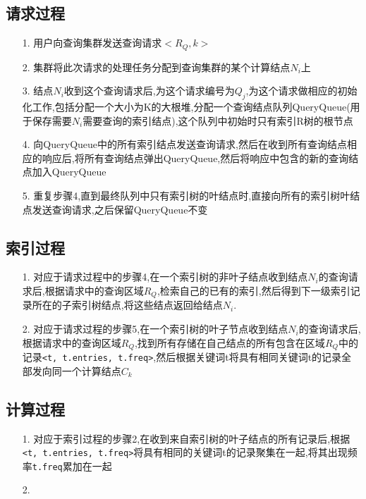 \documentclass{elegantpaper}
\begin{document}
\subsection{请求过程}
\begin{itemize}
    \item[1.] 用户向查询集群发送查询请求$<R_Q,k>$
    \item[2.] 集群将此次请求的处理任务分配到查询集群的某个计算结点$N_i$上
    \item[3.] 结点$N_i$收到这个查询请求后,为这个请求编号为$Q_j$,为这个请求做相应的初始化工作,包括分配一个大小为K的大根堆,分配一个查询结点队列QueryQueue(用于保存需要$N_i$需要查询的索引结点),这个队列中初始时只有索引R树的根节点
    \item[4.] 向QueryQueue中的所有索引结点发送查询请求,然后在收到所有查询结点相应的响应后,将所有查询结点弹出QueryQueue,然后将响应中包含的新的查询结点加入QueryQueue
    \item[5.] 重复步骤4,直到最终队列中只有索引树的叶结点时,直接向所有的索引树叶结点发送查询请求,之后保留QueryQueue不变
\end{itemize}
\subsection{索引过程}
\begin{itemize}
    \item[1.] 对应于请求过程中的步骤4,在一个索引树的非叶子结点收到结点$N_i$的查询请求后,根据请求中的查询区域$R_Q$,检索自己的已有的索引,然后得到下一级索引记录所在的子索引树结点,将这些结点返回给结点$N_i$.
    \item[2.] 对应于请求过程的步骤5,在一个索引树的叶子节点收到结点$N_i$的查询请求后,根据请求中的查询区域$R_Q$,找到所有存储在自己结点的所有包含在区域$R_Q$中的记录\verb|<t, t.entries, t.freq>|,然后根据关键词t将具有相同关键词t的记录全部发向同一个计算结点$C_k$
\end{itemize}
\subsection{计算过程}
\begin{itemize}
    \item[1.] 对应于索引过程的步骤2,在收到来自索引树的叶子结点的所有记录后,根据\verb|<t, t.entries, t.freq>|将具有相同的关键词t的记录聚集在一起,将其出现频率\verb|t.freq|累加在一起
    \item[2.] 
\end{itemize}
\end{document}
